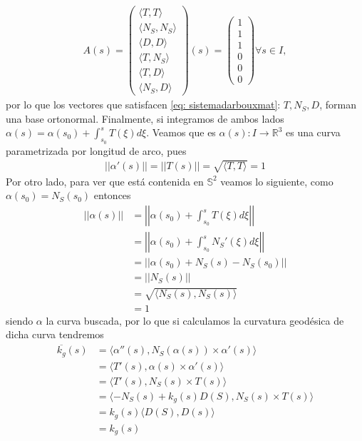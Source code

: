 \documentclass[oneside,11pt]{memoir}
\begin{document}
\begin{align*}
A(s)=
    \begin{pmatrix}
       \langle T,T \rangle\\
       \langle N_S, N_S \rangle\\
       \langle D,D\rangle\\
       \langle T,N_S\rangle\\
       \langle T,D\rangle\\
       \langle N_S, D\rangle
    \end{pmatrix}
    (s)
    =
    \begin{pmatrix}
       1\\
       1\\
       1\\
       0\\
       0\\
       0
    \end{pmatrix}
    \forall s\in I,
\end{align*}
por lo que los vectores que satisfacen \ref{eq: sistemadarbouxmat}: $T,N_S, D$, forman una base ortonormal. Finalmente, si integramos de ambos lados $\alpha(s)=\alpha(s_0)+\displaystyle{\int_{s_0}^sT(\xi)d\xi}$. Veamos que es $\alpha(s):I\to \mathbb{R}^3$ es una curva parametrizada por longitud de arco, pues
    \begin{align*}
        ||\alpha'(s)||=||T(s)||=\sqrt{\langle T, T\rangle}=1
    \end{align*}
    Por otro lado, para ver que está contenida en $\mathbb{S}^2$ veamos lo siguiente, como $\alpha(s_0)=N_S(s_0)$ entonces
    \begin{align*}
    \left|\left|\alpha(s)\right|\right|&=\left|\left|\alpha(s_0)+\displaystyle{\int_{s_0}^sT(\xi)d\xi}\right|\right|\\
        &=\left|\left|\alpha(s_0)+\displaystyle{\int_{s_0}^sN_S'(\xi)d\xi}\right|\right|\\
        &=\left|\left|\alpha(s_0)+N_S(s)-N_S(s_0)\right|\right|\\
        &=\left|\left|N_S(s)\right|\right|\\
        &=\sqrt{\langle N_S(s), N_S(s)\rangle}\\
        &=1
    \end{align*}
 siendo $\alpha$ la curva buscada, por lo que si calculamos la curvatura geodésica de dicha curva tendremos
 \begin{align*}
     \overline{k_g}(s)&=\langle \alpha''(s), N_S(\alpha(s))\times \alpha'(s) \rangle\\
     &= \langle T'(s), \alpha(s)\times \alpha'(s) \rangle\\
     &= \langle T'(s), N_S(s)\times T(s) \rangle\\
     &= \langle -N_S(s)+k_g(s)D(S), N_S(s)\times T(s) \rangle\\
     &= k_g(s) \langle D(S), D(s) \rangle\\
     &= k_g(s)
 \end{align*}
\end{document}
